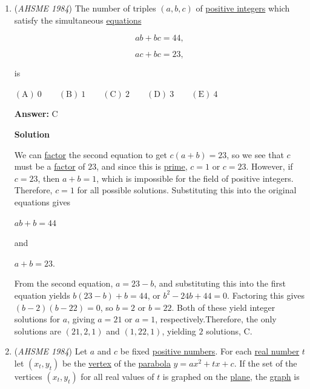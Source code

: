 \begin{enumerate}
 So we have $4$ possible solutions: $-2, \frac{2}{3}, 2,$ and $-\frac{4}{3}$. Checking for extraneous solutions, we find that the only ones that work are $2$ and $-\frac{4}{3}$, so there are $2$ solutions, $\boxed{\text{C}}$.

 


	\item (\textit{AHSME 1984}) The number of triples $(a, b, c)$ of \href{https://artofproblemsolving.com/wiki/index.php?title=Natural\_numbers}{positive integers} which satisfy the simultaneous \href{https://artofproblemsolving.com/wiki/index.php?title=Equation}{equations}


 
 \[ab+bc=44,\]

 \[ac+bc=23,\]


 is


 $\mathrm{(A) \ }0 \qquad \mathrm{(B) \ }1 \qquad \mathrm{(C) \ } 2 \qquad \mathrm{(D) \ }3 \qquad \mathrm{(E) \ } 4$

 \textbf{Answer: }C



\textbf{Solution}

We can \href{https://artofproblemsolving.com/wiki/index.php?title=Factoring}{factor} the second equation to get $c(a+b)=23$, so we see that $c$ must be a \href{https://artofproblemsolving.com/wiki/index.php?title=Factor}{factor} of $23$, and since this is \href{https://artofproblemsolving.com/wiki/index.php?title=Prime}{prime}, $c=1$ or $c=23$. However, if $c=23$, then $a+b=1$, which is impossible for the field of positive integers. Therefore, $c=1$ for all possible solutions. Substituting this into the original equations gives

 $ab+b=44$

 and 

 $a+b=23$.

 From the second equation, $a=23-b$, and substituting this into the first equation yields $b(23-b)+b=44$, or $b^2-24b+44=0$. Factoring this gives $(b-2)(b-22)=0$, so $b=2$ or $b=22$. Both of these yield integer solutions for $a$, giving $a=21$ or $a=1$, respectively.Therefore, the only solutions are $(21, 2, 1)$ and $(1, 22, 1)$, yielding $2$ solutions, $\boxed{\text{C}}$.

 


	\item (\textit{AHSME 1984}) Let $a$ and $c$ be fixed \href{https://artofproblemsolving.com/wiki/index.php?title=Natural\_numbers}{positive numbers}. For each \href{https://artofproblemsolving.com/wiki/index.php?title=Real\_number}{real number} $t$ let $(x_t, y_t)$ be the \href{https://artofproblemsolving.com/wiki/index.php?title=Vertex}{vertex} of the \href{https://artofproblemsolving.com/wiki/index.php?title=Parabola}{parabola} $y=ax^2+tx+c$. If the set of the vertices $(x_t, y_t)$ for all real values of $t$ is graphed on the \href{https://artofproblemsolving.com/wiki/index.php?title=Cartesian\_plane}{plane}, the \href{https://artofproblemsolving.com/wiki/index.php?title=Graph}{graph} is



\end{enumerate}
